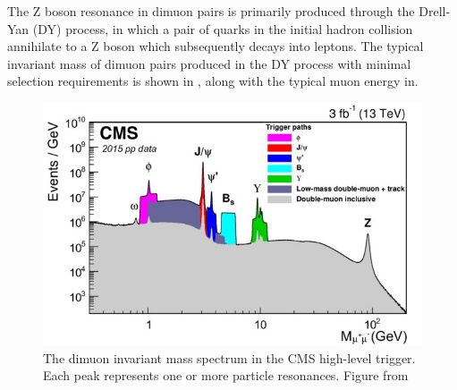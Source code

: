 The Z boson resonance in dimuon pairs is primarily produced through the Drell-Yan (DY) process, in which a pair of quarks in the initial hadron collision annihilate to a Z boson which subsequently decays into leptons.
The typical invariant mass of dimuon pairs produced in the DY process with minimal selection requirements is shown in , along with the typical muon energy in. %

\begin{figure}[ht]
	\label{fig:diMuonSpectrum}
	\centering
	\includegraphics[width=\textwidth]{figures/cms_diMuonSpectrum.jpg}
	\caption[Inclusive dimuon spectrum in CMS]{The dimuon invariant mass spectrum in the CMS high-level trigger. Each peak represents one or more particle resonances. Figure from \cite{cmsMuonPerformance}}
\end{figure}


